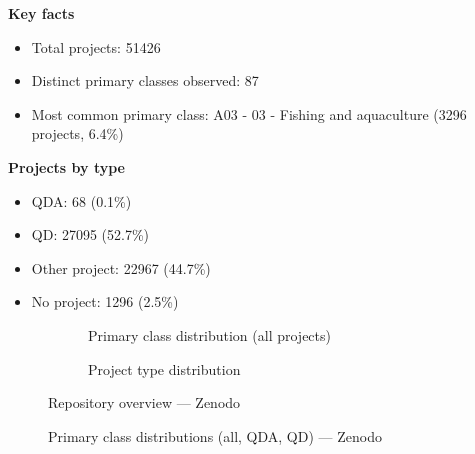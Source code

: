 \textbf{Key facts}

\begin{itemize}
    \item Total projects: 51426
    \item Distinct primary classes observed: 87
    \item Most common primary class: A03 - 03 - Fishing and aquaculture (3296 projects, 6.4\%)
\end{itemize}

\textbf{Projects by type}

\begin{itemize}
    \item QDA: 68 (0.1\%)
    \item QD: 27095 (52.7\%)
    \item Other project: 22967 (44.7\%)
    \item No project: 1296 (2.5\%)
\end{itemize}

\begin{figure}[H]
    \centering
    \begin{subfigure}[t]{0.49\textwidth}
        \centering
        
        \caption{Primary class distribution (all projects)}
    \end{subfigure}
    \hfill
    \begin{subfigure}[t]{0.49\textwidth}
        \centering
        
        \caption{Project type distribution}
    \end{subfigure}
    \caption{Repository overview --- Zenodo}
\end{figure}

\clearpage

\begin{figure}[H]
    \centering
    
    \par\vspace{0.8em}
    
    \par\vspace{0.8em}
    
    \caption{Primary class distributions (all, QDA, QD) --- Zenodo}
\end{figure}

